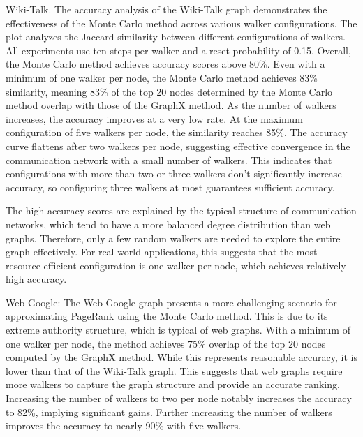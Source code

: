 Wiki-Talk. The accuracy analysis of the Wiki-Talk graph demonstrates the effectiveness of the Monte Carlo method across various walker configurations. The plot analyzes the Jaccard similarity between different configurations of walkers. All experiments use ten steps per walker and a reset probability of 0.15. Overall, the Monte Carlo method achieves accuracy scores above 80\%. Even with a minimum of one walker per node, the Monte Carlo method achieves 83\% similarity, meaning 83\% of the top 20 nodes determined by the Monte Carlo method overlap with those of the GraphX method. As the number of walkers increases, the accuracy improves at a very low rate. At the maximum configuration of five walkers per node, the similarity reaches 85\%. The accuracy curve flattens after two walkers per node, suggesting effective convergence in the communication network with a small number of walkers. This indicates that configurations with more than two or three walkers don't significantly increase accuracy, so configuring three walkers at most guarantees sufficient accuracy.\par
The high accuracy scores are explained by the typical structure of communication networks, which tend to have a more balanced degree distribution than web graphs. Therefore, only a few random walkers are needed to explore the entire graph effectively. For real-world applications, this suggests that the most resource-efficient configuration is one walker per node, which achieves relatively high accuracy.\par
Web-Google: The Web-Google graph presents a more challenging scenario for approximating PageRank using the Monte Carlo method. This is due to its extreme authority structure, which is typical of web graphs. With a minimum of one walker per node, the method achieves 75\% overlap of the top 20 nodes computed by the GraphX method. While this represents reasonable accuracy, it is lower than that of the Wiki-Talk graph. This suggests that web graphs require more walkers to capture the graph structure and provide an accurate ranking. Increasing the number of walkers to two per node notably increases the accuracy to 82\%, implying significant gains. Further increasing the number of walkers improves the accuracy to nearly 90\% with five walkers.\par
